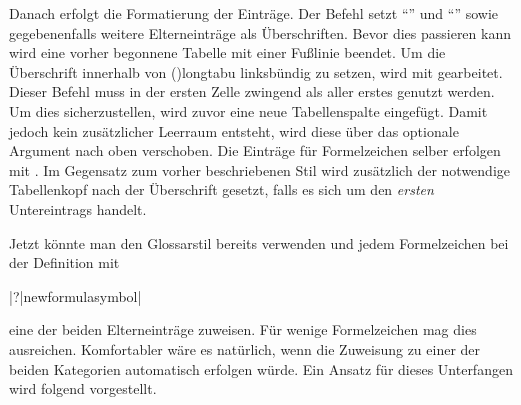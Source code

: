 \documentclass[%
  english,ngerman,%
  cdgeometry=no,DIV=12,%
  cd=false,cdfont=false,cdtitle=true,%
  headings=normal,%
  automark,%
  listof=toc,%
]{tudscrartcl}
\begin{document}
Danach erfolgt die Formatierung der Einträge. Der Befehl  
setzt \enquote{\greeklettersname} und \enquote{\romanlettersname} sowie 
gegebenenfalls weitere Elterneinträge als Überschriften. Bevor dies passieren 
kann wird eine vorher begonnene Tabelle mit einer Fußlinie beendet. Um die 
Überschrift innerhalb von \Environment(){longtabu} linksbündig zu 
setzen, wird mit  gearbeitet. Dieser Befehl muss in der 
ersten Zelle zwingend als aller erstes genutzt werden. Um dies sicherzustellen, 
wird zuvor eine neue Tabellenspalte eingefügt. Damit jedoch kein zusätzlicher 
Leerraum entsteht, wird diese über das optionale Argument nach oben verschoben.
Die Einträge für Formelzeichen selber erfolgen mit . Im 
Gegensatz zum vorher beschriebenen Stil  wird zusätzlich 
der notwendige Tabellenkopf nach der Überschrift gesetzt, falls es sich um den 
\emph{ersten} Untereintrags handelt.

Jetzt könnte man den Glossarstil  bereits verwenden 
und jedem Formelzeichen bei der Definition mit 
\begin{quoting}[leftmargin=\parindent]
\Macro|?|{newformulasymbol|%
  \MPValue{\dots}\MPValue{\dots}\MPValue{\dots}\MPValue{\dots}%
}
\end{quoting}
eine der beiden Elterneinträge zuweisen. Für wenige Formelzeichen mag dies 
ausreichen. Komfortabler wäre es natürlich, wenn die Zuweisung zu einer der 
beiden Kategorien automatisch erfolgen würde. Ein Ansatz für dieses Unterfangen 
wird folgend vorgestellt. 

\end{document}
